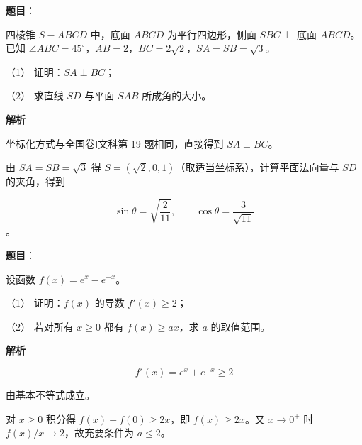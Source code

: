 \begin{answer}

\textbf{题目}：

四棱锥 $S-ABCD$ 中，底面 $ABCD$ 为平行四边形，侧面 $SBC\perp$ 底面 $ABCD$。已知 $\angle ABC=45^\circ$，$AB=2$，$BC=2\sqrt2$，$SA=SB=\sqrt3$。
\nopagebreak[4]
\begin{center}\end{center}
\nopagebreak[4]
（1） 证明：$SA\perp BC$；

（2） 求直线 $SD$ 与平面 $SAB$ 所成角的大小。

\textbf{解析}


坐标化方式与全国卷Ⅰ文科第 19 题相同，直接得到 $SA\perp BC$。


由 $SA=SB=\sqrt3$ 得 $S=(\sqrt2,0,1)$（取适当坐标系），计算平面法向量与 $SD$ 的夹角，得到

\nopagebreak[4]
\[
\sin\theta=\sqrt{\frac2{11}},
\qquad \cos\theta=\frac3{\sqrt{11}}
\]
。



\end{answer}
\begin{answer}

\textbf{题目}：

设函数 $f(x)=e^x-e^{-x}$。

（1） 证明：$f(x)$ 的导数 $f'(x)\geqslant2$；

（2） 若对所有 $x\geqslant0$ 都有 $f(x)\geqslant ax$，求 $a$ 的取值范围。

\textbf{解析}


\nopagebreak[4]
\[
f'(x)=e^x+e^{-x}\geqslant2
\]

由基本不等式成立。


对 $x\geqslant0$ 积分得 $f(x)-f(0)\geqslant2x$，即 $f(x)\geqslant2x$。又 $x\to0^+$ 时 $f(x)/x\to2$，故充要条件为 $a\leqslant2$。



\end{answer}
